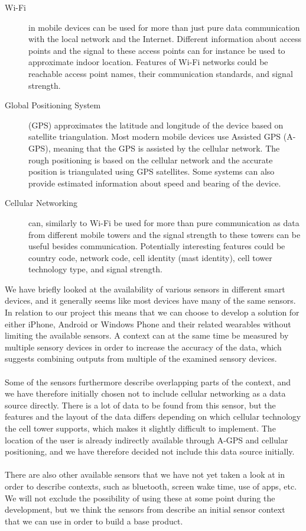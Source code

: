 \begin{description}
    \item[Wi-Fi] in mobile devices can be used for more than just pure data communication with the local network and the Internet. Different information about access points and the signal to these access points can for instance be used to approximate indoor location. Features of Wi-Fi networks could be reachable access point names, their communication standards, and signal strength. 
    \item[Global Positioning System] (GPS) approximates the latitude and longitude of the device based on satellite triangulation. Most modern mobile devices use Assisted GPS (A-GPS), meaning that the GPS is assisted by the cellular network. The rough positioning is based on the cellular network and the accurate position is triangulated using GPS satellites. Some systems can also provide estimated information about speed and bearing of the device.
    \item[Cellular Networking] can, similarly to Wi-Fi be used for more than pure communication as data from different mobile towers and the signal strength to these towers can be useful besides communication. Potentially interesting features could be country code, network code, cell identity (mast identity), cell tower technology type, and signal strength.
\end{description}

We have briefly looked at the availability of various sensors in different smart devices, and it generally seems like most devices have many of the same sensors. In relation to our project this means that we can choose to develop a solution for either iPhone, Android or Windows Phone and their related wearables without limiting the available sensors. A context can at the same time be measured by multiple sensory devices in order to increase the accuracy of the data, which suggests combining outputs from multiple of the examined sensory devices. 
\\\\
Some of the sensors furthermore describe overlapping parts of the context, and we have therefore initially chosen not to include cellular networking as a data source directly. There is a lot of data to be found from this sensor, but the features and the layout of the data differs depending on which cellular technology the cell tower supports, which makes it slightly difficult to implement. The location of the user is already indirectly available through A-GPS and cellular positioning, and we have therefore decided not include this data source initially. 
\\\\
There are also other available sensors that we have not yet taken a look at in order to describe contexts, such as bluetooth, screen wake time, use of apps, etc. We will not exclude the possibility of using these at some point during the development, but we think the sensors from  describe an initial sensor context that we can use in order to build a base product. 